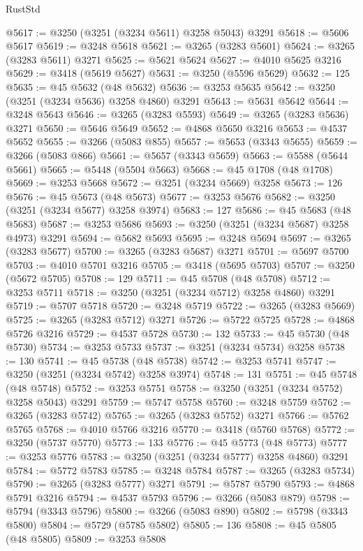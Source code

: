 \begin{lexlean}{RustStd}
\begin{coremodule}
@5617 := @3250 (@3251 (@3234 @5611) @3258 @5043) @3291
@5618 := @5606 @5617
@5619 := @3248 @5618
@5621 := @3265 (@3283 @5601)
@5624 := @3265 (@3283 @5611) @3271
@5625 := @5621 @5624
@5627 := @4010 @5625 @3216
@5629 := @3418 (@5619 @5627)
@5631 := @3250 (@5596 @5629)
@5632 := 125
@5635 := @45 @5632 (@48 @5632)
@5636 := @3253 @5635
@5642 := @3250 (@3251 (@3234 @5636) @3258 @4860) @3291
@5643 := @5631 @5642
@5644 := @3248 @5643
@5646 := @3265 (@3283 @5593)
@5649 := @3265 (@3283 @5636) @3271
@5650 := @5646 @5649
@5652 := @4868 @5650 @3216
@5653 := @4537 @5652
@5655 := @3266 (@5083 @855)
@5657 := @5653 (@3343 @5655)
@5659 := @3266 (@5083 @866)
@5661 := @5657 (@3343 @5659)
@5663 := @5588 (@5644 @5661)
@5665 := @5448 (@5504 @5663)
@5668 := @45 @1708 (@48 @1708)
@5669 := @3253 @5668
@5672 := @3251 (@3234 @5669) @3258
@5673 := 126
@5676 := @45 @5673 (@48 @5673)
@5677 := @3253 @5676
@5682 := @3250 (@3251 (@3234 @5677) @3258 @3974)
@5683 := 127
@5686 := @45 @5683 (@48 @5683)
@5687 := @3253 @5686
@5693 := @3250 (@3251 (@3234 @5687) @3258 @4973) @3291
@5694 := @5682 @5693
@5695 := @3248 @5694
@5697 := @3265 (@3283 @5677)
@5700 := @3265 (@3283 @5687) @3271
@5701 := @5697 @5700
@5703 := @4010 @5701 @3216
@5705 := @3418 (@5695 @5703)
@5707 := @3250 (@5672 @5705)
@5708 := 129
@5711 := @45 @5708 (@48 @5708)
@5712 := @3253 @5711
@5718 := @3250 (@3251 (@3234 @5712) @3258 @4860) @3291
@5719 := @5707 @5718
@5720 := @3248 @5719
@5722 := @3265 (@3283 @5669)
@5725 := @3265 (@3283 @5712) @3271
@5726 := @5722 @5725
@5728 := @4868 @5726 @3216
@5729 := @4537 @5728
@5730 := 132
@5733 := @45 @5730 (@48 @5730)
@5734 := @3253 @5733
@5737 := @3251 (@3234 @5734) @3258
@5738 := 130
@5741 := @45 @5738 (@48 @5738)
@5742 := @3253 @5741
@5747 := @3250 (@3251 (@3234 @5742) @3258 @3974)
@5748 := 131
@5751 := @45 @5748 (@48 @5748)
@5752 := @3253 @5751
@5758 := @3250 (@3251 (@3234 @5752) @3258 @5043) @3291
@5759 := @5747 @5758
@5760 := @3248 @5759
@5762 := @3265 (@3283 @5742)
@5765 := @3265 (@3283 @5752) @3271
@5766 := @5762 @5765
@5768 := @4010 @5766 @3216
@5770 := @3418 (@5760 @5768)
@5772 := @3250 (@5737 @5770)
@5773 := 133
@5776 := @45 @5773 (@48 @5773)
@5777 := @3253 @5776
@5783 := @3250 (@3251 (@3234 @5777) @3258 @4860) @3291
@5784 := @5772 @5783
@5785 := @3248 @5784
@5787 := @3265 (@3283 @5734)
@5790 := @3265 (@3283 @5777) @3271
@5791 := @5787 @5790
@5793 := @4868 @5791 @3216
@5794 := @4537 @5793
@5796 := @3266 (@5083 @879)
@5798 := @5794 (@3343 @5796)
@5800 := @3266 (@5083 @890)
@5802 := @5798 (@3343 @5800)
@5804 := @5729 (@5785 @5802)
@5805 := 136
@5808 := @45 @5805 (@48 @5805)
@5809 := @3253 @5808

\end{coremodule}
\end{lexlean}
